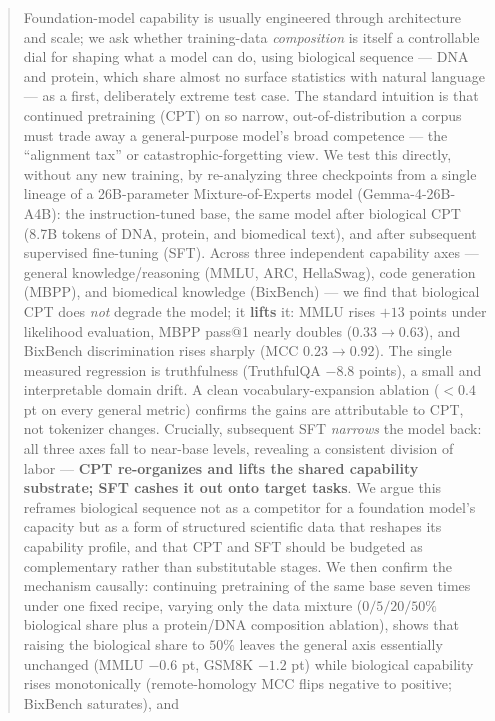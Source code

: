 \documentclass[11pt]{article}
\begin{document}
\begin{abstract}
\noindent Foundation-model capability is usually engineered through architecture and scale; we
ask whether training-data \emph{composition} is itself a controllable dial for shaping what a
model can do, using biological sequence --- DNA and protein, which share almost no surface
statistics with natural language --- as a first, deliberately extreme test case. The standard
intuition is that continued pretraining (CPT) on so narrow, out-of-distribution a corpus must
trade away a general-purpose model's broad competence --- the ``alignment tax'' or
catastrophic-forgetting view. We test this directly, without any new training, by re-analyzing
three checkpoints from a single lineage
of a 26B-parameter Mixture-of-Experts model (Gemma-4-26B-A4B): the instruction-tuned base,
the same model after biological CPT (8.7B tokens of DNA, protein, and biomedical text), and
after subsequent supervised fine-tuning (SFT). Across three independent capability axes ---
general knowledge/reasoning (MMLU, ARC, HellaSwag), code generation (MBPP), and biomedical
knowledge (BixBench) --- we find that biological CPT does \emph{not} degrade the model; it
\textbf{lifts} it: MMLU rises $+13$ points under likelihood evaluation, MBPP pass@1 nearly
doubles ($0.33\!\to\!0.63$), and BixBench discrimination rises sharply (MCC $0.23\!\to\!0.92$).
The single measured regression
is truthfulness (TruthfulQA $-8.8$ points), a small and interpretable domain drift. A clean
vocabulary-expansion ablation ($<\!0.4$ pt on every general metric) confirms the gains are
attributable to CPT, not tokenizer changes. Crucially, subsequent SFT \emph{narrows} the model
back: all three axes fall to near-base levels, revealing a consistent division of labor ---
\textbf{CPT re-organizes and lifts the shared capability substrate; SFT cashes it out onto
target tasks}. We argue this reframes biological sequence not as a competitor for a foundation
model's capacity but as a form of structured scientific data that reshapes its capability
profile, and that CPT and SFT should be budgeted as complementary rather than substitutable
stages. We then confirm the mechanism causally: continuing pretraining of the same base seven
times under one fixed recipe, varying only the data mixture ($0/5/20/50\%$ biological share plus
a protein/DNA composition ablation), shows that raising the biological share to $50\%$ leaves the
general axis essentially unchanged (MMLU $-0.6$ pt, GSM8K $-1.2$ pt) while biological capability
rises monotonically (remote-homology MCC flips negative to positive; BixBench saturates), and

\end{abstract}
\end{document}
